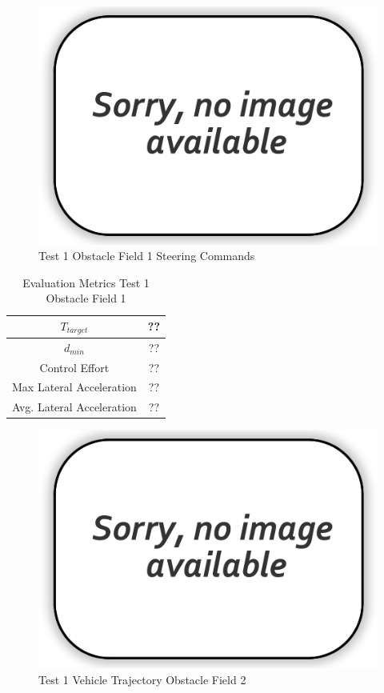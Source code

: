\documentclass[12pt,twocolumn]{article}
\begin{document}
\begin{figure}
	\centering
	\includegraphics[width=\columnwidth]{Figs/no-image.png}
	\caption{\small Test 1 Obstacle Field 1 Steering Commands}  
	\label{fig:Test1_Obst1_Steer}
\end{figure}

\begin{table}
\begin{center}
	\begin{tabular}{||c |c||} 
		\hline
		$T_{target}$ & ??\\ 
		\hline
		$d_{min}$ & ??\\
		\hline
		Control Effort & ??\\
		\hline
		Max Lateral Acceleration & ??\\
		\hline
		Avg. Lateral Acceleration & ??\\
		\hline
	\end{tabular}
\end{center}
\caption{Evaluation Metrics Test 1 Obstacle Field 1}
\label{t:EvalTest1Obst1}
\end{table}

\begin{figure}
	\centering
	\includegraphics[width=\columnwidth]{Figs/no-image.png}
	\caption{\small Test 1 Vehicle Trajectory Obstacle Field 2}  
	\label{fig:Test1_Obst2}
\end{figure}
\end{document}
